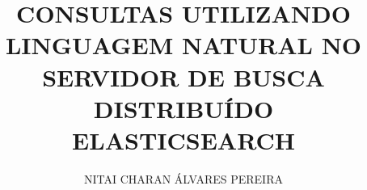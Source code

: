 \author{NITAI CHARAN ÁLVARES PEREIRA}
\title{CONSULTAS UTILIZANDO LINGUAGEM NATURAL NO SERVIDOR DE BUSCA DISTRIBUÍDO ELASTICSEARCH}
\newcommand{\cabecalhocapa}{CENTRO UNIVERSITÁRIO DE JOÃO PESSOA - UNIPÊ\\
PRÓ-REITORIA ACADÊMICA - PROAC\\
CURSO DE BACHARELADO EM CIÊNCIA DA COMPUTAÇÃO}
\newcommand{\subtitulo}{}
\newcommand{\nomedocurso}{Bacharelado em Ciência da Computação}
\newcommand{\titulobar}{Ciência da Computação}
\newcommand{\orientador}{Fábio Falcão da França}
\newcommand{\profa}{Nome do Professor A}
\newcommand{\profb}{Nome do Professor B}
\newcommand{\profc}{Nome do Professor C}
\newcommand{\insta}{UNIPÊ}
\newcommand{\instb}{UNIPÊ}
\newcommand{\instc}{UNIPÊ}
\newcommand{\coordenador}{Thatyana Carla Dias Guerra}
\newcommand{\departamento}{Nome do Departamento}
\newcommand{\instituicao}{Centro Universitário de João Pessoa - UNIPÊ}
